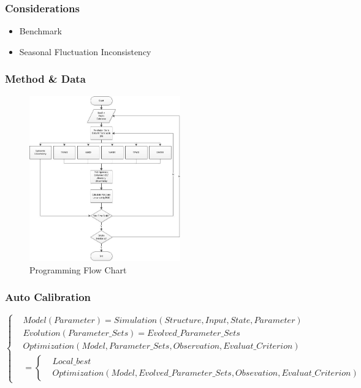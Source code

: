 \documentclass{beamer}
\begin{document}
 

\begin{frame}
\frametitle{Considerations}
\begin{itemize}
\item Benchmark
\item Seasonal Fluctuation Inconsistency
\end{itemize}
\end{frame}

\begin{frame}
\frametitle{Method \& Data}
\begin{figure}[htbp]
\centering
\includegraphics[width=6.5cm]{flowchart.jpg}
\caption{Programming Flow Chart} \label{fig:graph}
\end{figure}
\end{frame}

\begin{frame}
\frametitle{Auto Calibration}
\begin{footnotesize}
\begin{equation*} 
\left\{
\begin{aligned}
   &Model(Parameter)=Simulation(Structure,Input,State,Parameter)\\
   &Evolution(Parameter\_Sets)=Evolved\_Parameter\_Sets \\
   &Optimization (Model,Parameter\_Sets,Observation,Evaluat\_Criterion)\\&=\left\{\begin{aligned}&Local\_best\\&Optimization(Model,Evolved\_Parameter\_Sets,Obsevation,Evaluat\_Criterion)\end{aligned}\right.
\end{aligned}
\right.
\end{equation*}
\end{footnotesize}
\end{frame}
\end{document}
